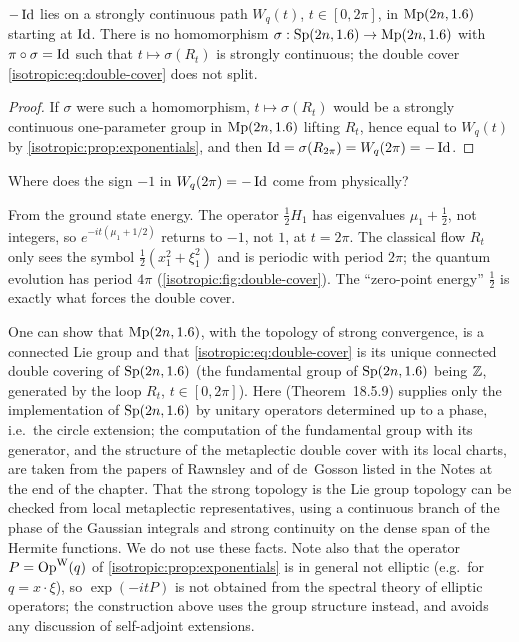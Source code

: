 \begin{corollary}\label{isotropic:cor:nontrivial}
$-\operatorname{Id}$ lies on a strongly continuous path $W_q(t)$, $t\in[0,2\pi]$, in
$\mathrm{Mp}(2n,1.6)$ starting at $\operatorname{Id}$. There is no homomorphism
$\sigma:\mathrm{Sp}(2n,1.6)\to\mathrm{Mp}(2n,1.6)$ with $\pi\circ\sigma=\operatorname{Id}$ such
that $t\mapsto\sigma(R_t)$ is strongly continuous; the double cover
\eqref{isotropic:eq:double-cover} does not split.
\end{corollary}
\begin{proof}
If $\sigma$ were such a homomorphism, $t\mapsto\sigma(R_t)$ would be a strongly
continuous one-parameter group in $\mathrm{Mp}(2n,1.6)$ lifting $R_t$, hence equal
to $W_q(t)$ by \cref{isotropic:prop:exponentials}, and then
$\operatorname{Id}=\sigma(R_{2\pi})=W_q(2\pi)=-\operatorname{Id}$.
\end{proof}

\begin{question}
Where does the sign $-1$ in $W_q(2\pi)=-\operatorname{Id}$ come from physically?
\end{question}
\begin{answer}
From the ground state energy. The operator $\frac12H_1$ has eigenvalues
$\mu_1+\frac12$, not integers, so $e^{-it(\mu_1+1/2)}$ returns to $-1$,
not $1$, at $t=2\pi$. The classical flow $R_t$ only sees the symbol
$\frac12(x_1^2+\xi_1^2)$ and is periodic with period $2\pi$; the quantum
evolution has period $4\pi$ (\cref{isotropic:fig:double-cover}). The
``zero-point energy'' $\frac12$ is exactly what forces the double cover.
\end{answer}

\begin{remark}\label{isotropic:rem:mp-topology}
One can show that $\mathrm{Mp}(2n,1.6)$, with the topology of strong
convergence, is a connected Lie group and that \eqref{isotropic:eq:double-cover}
is its unique connected double covering of $\mathrm{Sp}(2n,1.6)$ (the
fundamental group of $\mathrm{Sp}(2n,1.6)$ being $\mathbb{Z}$, generated by the loop
$R_t$, $t\in[0,2\pi]$). Here \cite[Section~18.5]{Hormander-III} (Theorem~18.5.9)
supplies only the implementation of $\mathrm{Sp}(2n,1.6)$ by unitary operators
determined up to a phase, i.e.\ the circle extension; the computation of the
fundamental group with its generator, and the structure of the metaplectic
double cover with its local charts, are taken from the papers of Rawnsley and
of de~Gosson listed in the Notes at the end of the chapter. That the strong
topology is the Lie group topology can be checked from local metaplectic
representatives, using a continuous branch of the phase of the Gaussian
integrals and strong continuity on the dense span of the Hermite functions.
We do not use these facts. Note also that the operator
$P=\operatorname{Op}^{\mathrm{W}}(q)$ of \cref{isotropic:prop:exponentials} is in general not elliptic
(e.g.\ for $q=x\cdot\xi$), so $\exp(-itP)$ is not obtained from the spectral
theory of elliptic operators; the construction above uses the group structure
instead, and avoids any discussion of self-adjoint extensions.
\end{remark}

